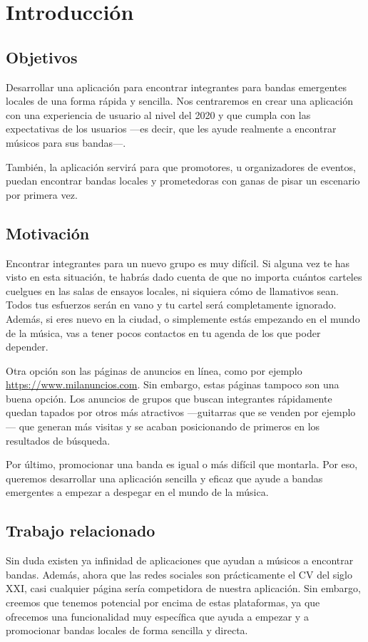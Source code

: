 \documentclass[a4paper,12pt]{article}
\begin{document}
\section{Introducción}
\subsection{Objetivos}
Desarrollar una aplicación para encontrar integrantes para bandas emergentes locales de una forma rápida y sencilla. Nos centraremos en crear una aplicación con una experiencia de usuario al nivel del 2020 y que cumpla con las expectativas de los usuarios ---es decir, que les ayude realmente a encontrar músicos para sus bandas---.

También, la aplicación servirá para que promotores, u organizadores de eventos, puedan encontrar bandas locales y prometedoras con ganas de pisar un escenario por primera vez.
\subsection{Motivación}
Encontrar integrantes para un nuevo grupo es muy difícil. Si alguna vez te has visto en esta situación, te habrás dado cuenta de que no importa cuántos carteles cuelgues en las salas de ensayos locales, ni siquiera cómo de llamativos sean. Todos tus esfuerzos serán en vano y tu cartel será completamente ignorado. Además, si eres nuevo en la ciudad, o simplemente estás empezando en el mundo de la música, vas a tener pocos contactos en tu agenda de los que poder depender.

Otra opción son las páginas de anuncios en línea, como por ejemplo \url{https://www.milanuncios.com}. Sin embargo, estas páginas tampoco son una buena opción. Los anuncios de grupos que buscan integrantes rápidamente quedan tapados por otros más atractivos ---guitarras que se venden por ejemplo--- que generan más visitas y se acaban posicionando de primeros en los resultados de búsqueda.

Por último, promocionar una banda es igual o más difícil que montarla. 
Por eso, queremos desarrollar una aplicación sencilla y eficaz que ayude a bandas emergentes a empezar a despegar en el mundo de la música.
\subsection{Trabajo relacionado}
Sin duda existen ya infinidad de aplicaciones que ayudan a músicos a encontrar bandas. Además, ahora que las redes sociales son prácticamente el CV del siglo XXI, casi cualquier página sería competidora de nuestra aplicación. Sin embargo, creemos que tenemos potencial por encima de estas plataformas, ya que ofrecemos una funcionalidad muy específica que ayuda a empezar y a promocionar bandas locales de forma sencilla y directa.
\end{document}
